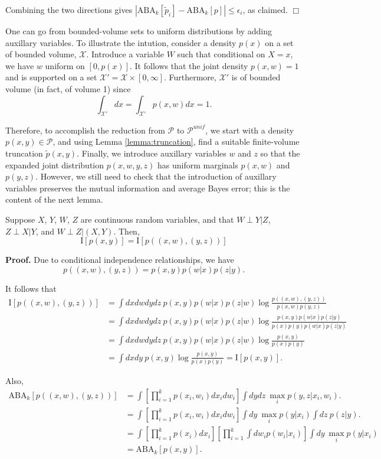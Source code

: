 Combining the two directions gives $|\text{ABA}_k[\tilde{p}_i]
- \text{ABA}_k[p]| \leq \epsilon_i$, as claimed. $\Box$

One can go from bounded-volume sets to uniform distributions by adding
auxillary variables.  To illustrate the intution, consider a density
$p(x)$ on a set of bounded volume, $\mathcal{X}$.  Introduce a
variable $W$ such that conditional on $X = x$, we have $w$ uniform on
$[0, p(x)]$.  It follows that the joint density $p(x, w) = 1$ and is
supported on a set $\mathcal{X}' = \mathcal{X} \times [0,\infty]$.
Furthermore, $\mathcal{X}'$ is of bounded volume (in fact, of volume 1) since
\[
\int_{\mathcal{X}'} dx = \int_{\mathcal{X}'} p(x, w) dx = 1.
\]

Therefore, to accomplish the reduction from $\mathcal{P}$ to
$\mathcal{P}^{unif}$, we start with a density
$p(x,y) \in \mathcal{P}$, and using Lemma \ref{lemma:truncation},
find a suitable finite-volume truncation $\tilde{p}(x, y).$ Finally,
we introduce auxillary variables $w$ and $z$ so that the expanded
joint distribution $p(x, w, y, z)$ has uniform marginals $p(x, w)$ and
$p(y, z)$.  However, we still need to check that the introduction of
auxillary variables preserves the mutual information and average Bayes
error; this is the content of the next lemma.

\begin{lemma}
Suppose $X$, $Y$, $W$, $Z$ are continuous random variables, and that
$W\perp Y|Z$, $Z \perp X|Y$, and $W \perp Z|(X,Y)$.  Then,
\[
\text{I}[p(x, y)] = \text{I}[p((x,w), (y,z))]
\]
\end{lemma}
\textbf{Proof.}
Due to conditional independence relationships, we have
\[
p((x,w), (y,z)) = p(x,y)p(w|x)p(z|y).
\]

It follows that
\begin{align*}
\text{I}[p((x,w), (y,z))] &= \int dx dw dy dz  \ p(x,y)p(w|x)p(z|w) \log \frac{p((x,w), (y,z))}{p(x,w)p(y,z)}
\\&= \int dx dw dy dz \ p(x,y)p(w|x)p(z|w) \log \frac{p(x, y)p(w|x)p(z|y)}{p(x)p(y)p(w|x)p(z|y)}
\\&= \int dx dw dy dz \ p(x,y)p(w|x)p(z|w) \log \frac{p(x, y)}{p(x)p(y)}
\\&= \int dx dy \ p(x,y) \log \frac{p(x, y)}{p(x)p(y)} = \text{I}[p(x,y)].
\end{align*}

Also,
\begin{align*}
\text{ABA}_k[p((x,w),(y,z))] 
&= \int \left[\prod_{i=1}^k p(x_i, w_i) dx_i dw_i \right] \int dy dz \ \max_i p(y,z|x_i, w_i).
\\&= \int \left[\prod_{i=1}^k p(x_i, w_i) dx_i dw_i \right] \int dy \ \max_i p(y|x_i) \int dz \ p(z|y).
\\&= \int \left[\prod_{i=1}^k p(x_i) dx_i \right] \left[\prod_{i=1}^k \int dw_i p(w_i|x_i)\right] \int dy \ \max_i p(y|x_i)
\\&= \text{ABA}_k[p(x,y)].
\end{align*}

